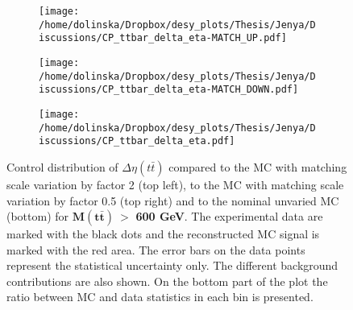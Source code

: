 \begin{figure}[t]
\centering
\begin{subfigure}
  \centering
  \texttt{[image: /home/dolinska/Dropbox/desy\_plots/Thesis/Jenya/Discussions/CP\_ttbar\_delta\_eta-MATCH\_UP.pdf]}
\end{subfigure}
\begin{subfigure}
  \centering
  \texttt{[image: /home/dolinska/Dropbox/desy\_plots/Thesis/Jenya/Discussions/CP\_ttbar\_delta\_eta-MATCH\_DOWN.pdf]}
\end{subfigure}
\begin{subfigure}
  \centering
  \texttt{[image: /home/dolinska/Dropbox/desy\_plots/Thesis/Jenya/Discussions/CP\_ttbar\_delta\_eta.pdf]}
\end{subfigure}
\caption{Control distribution of $\Delta\eta({t\bar{t}})$ compared to the MC with matching scale variation by factor 2 (top left), to the MC with matching scale variation 
         by factor 0.5 (top right) and to the nominal unvaried MC (bottom) for $\mathbf{M(t\bar{t})\: >}$ \textbf{600 GeV}. The experimental data are marked with the black 
         dots and the reconstructed MC signal is marked with the red area. The error
         bars on the data points represent the statistical uncertainty only. The 
         different background contributions are also shown. On the bottom part of the plot the ratio between MC and data statistics in each bin
         is presented.}
\label{fig:CP_eta_match}
\end{figure}

